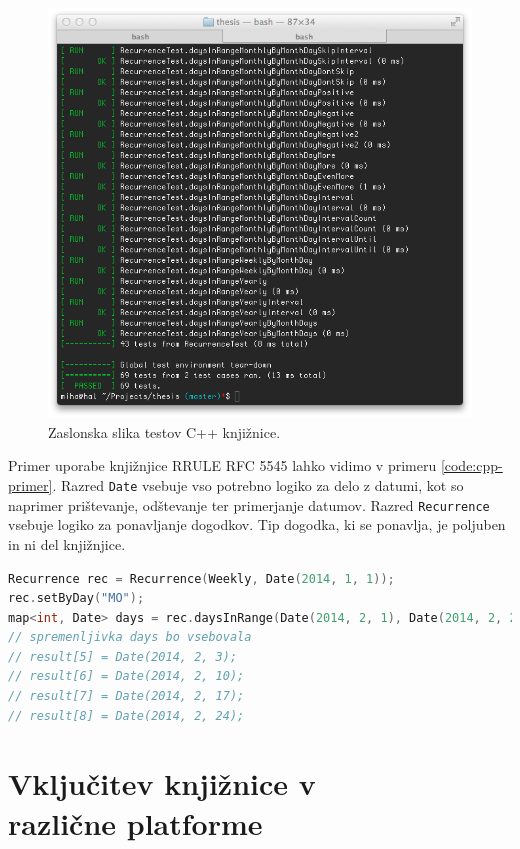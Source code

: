 \begin{figure}
 \includegraphics[width=\linewidth]{cpp-tests}
 \caption{Zaslonska slika testov C++ knjižnice.}
 \label{fig:cpp-tests}
\end{figure}

Primer uporabe knjižnjice RRULE RFC 5545 lahko vidimo v primeru \ref{code:cpp-primer}. Razred \texttt{Date} vsebuje vso potrebno logiko za delo z datumi, kot so naprimer prištevanje, odštevanje ter primerjanje datumov. Razred \texttt{Recurrence} vsebuje logiko za ponavljanje dogodkov. Tip dogodka, ki se ponavlja, je poljuben in ni del knjižnjice.

\begin{lstlisting}[caption={Primer uporabe C++ knjižnjice RRULE standarda RFC 5545. Izbrani dogodek bi se s tem pravilom ponavljal tedensko, vsak ponedeljek, od 1. januarja 2014 naprej.}, label=code:cpp-primer, language=C++]
Recurrence rec = Recurrence(Weekly, Date(2014, 1, 1));
rec.setByDay("MO");
map<int, Date> days = rec.daysInRange(Date(2014, 2, 1), Date(2014, 2, 28));
// spremenljivka days bo vsebovala
// result[5] = Date(2014, 2, 3);
// result[6] = Date(2014, 2, 10);
// result[7] = Date(2014, 2, 17);
// result[8] = Date(2014, 2, 24);
\end{lstlisting}

\chapter[Vključitev knjižnice v različne platforme]{Vključitev knjižnice v \\ različne platforme}
\label{chap:cross-platform}

